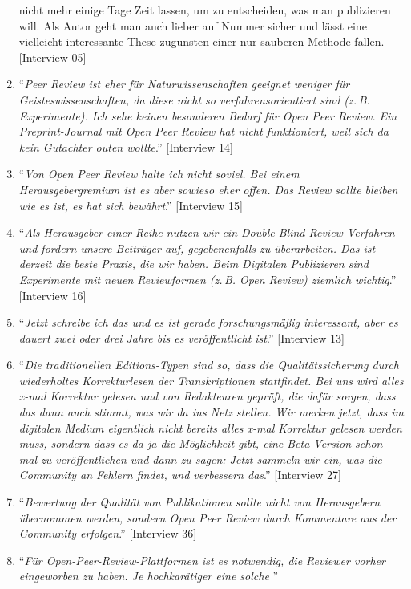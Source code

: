 \documentclass[a4paper,
fontsize=11pt,
oneside,
numbers=noperiodatend,
parskip=half-,
bibliography=totoc,
final
]{scrartcl}
\begin{document}
\begin{enumerate}
{{  nicht mehr einige Tage Zeit lassen, um zu entscheiden, was man
  publizieren will. Als Autor geht man auch lieber auf Nummer sicher und
  lässt eine vielleicht interessante These zugunsten einer nur sauberen
  Methode fallen}.} {[}Interview 05{]}
\item
  \enquote{\emph{Peer Review ist eher für Naturwissenschaften geeignet
  weniger für Geisteswissenschaften, da diese nicht so
  verfahrensorientiert sind (z.\,B. Experimente). Ich sehe keinen
  besonderen Bedarf für Open Peer Review. Ein Preprint-Journal mit Open
  Peer Review hat nicht funktioniert, weil sich da kein Gutachter outen
  wollte}.} {[}Interview 14{]}
\item
  \enquote{\emph{Von Open Peer Review halte ich nicht soviel. Bei einem
  Herausgebergremium ist es aber sowieso eher offen. Das Review sollte
  bleiben wie es ist, es hat sich bewährt}.} {[}Interview 15{]}
\item
  \enquote{\emph{Als Herausgeber einer Reihe nutzen wir ein
  Double-Blind-Review-Verfahren und fordern unsere Beiträger auf,
  gegebenenfalls zu überarbeiten. Das ist derzeit die beste Praxis, die
  wir haben. Beim Digitalen Publizieren sind Experimente mit neuen
  Reviewformen (z.\,B. Open Review) ziemlich wichtig}.} {[}Interview 16{]}
\item
  \enquote{\emph{Jetzt schreibe ich das und es ist gerade
  forschungsmäßig interessant, aber es dauert zwei oder drei Jahre bis
  es veröffentlicht ist}.} {[}Interview 13{]}
\item
  \enquote{\emph{Die traditionellen Editions-Typen sind so, dass die
  Qualitätssicherung durch wiederholtes Korrekturlesen der
  Transkriptionen stattfindet. Bei uns wird alles x-mal Korrektur
  gelesen und von Redakteuren geprüft, die dafür sorgen, dass das dann
  auch stimmt, was wir da ins Netz stellen. Wir merken jetzt, dass im
  digitalen Medium eigentlich nicht bereits alles x-mal Korrektur
  gelesen werden muss, sondern dass es da ja die Möglichkeit gibt, eine
  Beta-Version schon mal zu veröffentlichen und dann zu sagen: Jetzt
  sammeln wir ein, was die Community an Fehlern findet, und verbessern
  das}.} {[}Interview 27{]}
\item
  \enquote{\emph{Bewertung der Qualität von Publikationen sollte nicht
  von Herausgebern übernommen werden, sondern Open Peer Review durch
  Kommentare aus der Community erfolgen}.} {[}Interview 36{]}
\item
  \enquote{\emph{Für Open-Peer-Review-Plattformen ist es notwendig, die
  Reviewer vorher eingeworben zu haben. Je hochkarätiger eine solche
}}
\end{enumerate}
\end{document}
